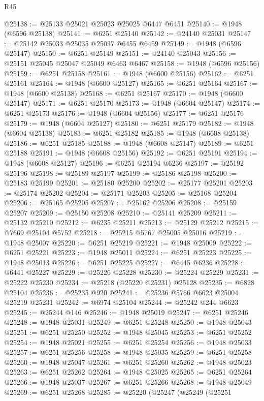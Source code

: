 \begin{lexlean}{R45}
\begin{coremodule}
{@25138 := @25133 @25021 @25023 @25025 @6447 @6451
@25140 := @1948 (@6596 @25138)
@25141 := @6251 @25140
@25142 := @24140 @25031
@25147 := @25142 @25033 @25035 @25037 @6455 @6459
@25149 := @1948 (@6596 @25147)
@25150 := @6251 @25149
@25151 := @24140 @25043
@25156 := @25151 @25045 @25047 @25049 @6463 @6467
@25158 := @1948 (@6596 @25156)
@25159 := @6251 @25158
@25161 := @1948 (@6600 @25156)
@25162 := @6251 @25161
@25164 := @1948 (@6600 @25127)
@25165 := @6251 @25164
@25167 := @1948 (@6600 @25138)
@25168 := @6251 @25167
@25170 := @1948 (@6600 @25147)
@25171 := @6251 @25170
@25173 := @1948 (@6604 @25147)
@25174 := @6251 @25173
@25176 := @1948 (@6604 @25156)
@25177 := @6251 @25176
@25179 := @1948 (@6604 @25127)
@25180 := @6251 @25179
@25182 := @1948 (@6604 @25138)
@25183 := @6251 @25182
@25185 := @1948 (@6608 @25138)
@25186 := @6251 @25185
@25188 := @1948 (@6608 @25147)
@25189 := @6251 @25188
@25191 := @1948 (@6608 @25156)
@25192 := @6251 @25191
@25194 := @1948 (@6608 @25127)
@25196 := @6251 @25194 @6236
@25197 := @25192 @25196
@25198 := @25189 @25197
@25199 := @25186 @25198
@25200 := @25183 @25199
@25201 := @25180 @25200
@25202 := @25177 @25201
@25203 := @25174 @25202
@25204 := @25171 @25203
@25205 := @25168 @25204
@25206 := @25165 @25205
@25207 := @25162 @25206
@25208 := @25159 @25207
@25209 := @25150 @25208
@25210 := @25141 @25209
@25211 := @25132 @25210
@25212 := @6235 @25211
@25213 := @25129 @25212
@25215 := @7669 @25104 @5752
@25218 := @25215 @5767 @25005 @25016
@25219 := @1948 @25007
@25220 := @6251 @25219
@25221 := @1948 @25009
@25222 := @6251 @25221
@25223 := @1948 @25011
@25224 := @6251 @25223
@25225 := @1948 @25013
@25226 := @6251 @25225
@25227 := @6445 @6236
@25228 := @6441 @25227
@25229 := @25226 @25228
@25230 := @25224 @25229
@25231 := @25222 @25230
@25234 := @25218 (@25220 @25231) @25128
@25235 := @6828 @25104
@25236 := @25235 @920
@25241 := @25236 @5766 @6623 @25004 @25219 @25231
@25242 := @6974 @25104
@25244 := @25242 @244 @6623
@25245 := @25244 @146
@25246 := @1948 @25019
@25247 := @6251 @25246
@25248 := @1948 @25031
@25249 := @6251 @25248
@25250 := @1948 @25043
@25251 := @6251 @25250
@25252 := @1948 @25045
@25253 := @6251 @25252
@25254 := @1948 @25021
@25255 := @6251 @25254
@25256 := @1948 @25033
@25257 := @6251 @25256
@25258 := @1948 @25035
@25259 := @6251 @25258
@25260 := @1948 @25047
@25261 := @6251 @25260
@25262 := @1948 @25023
@25263 := @6251 @25262
@25264 := @1948 @25025
@25265 := @6251 @25264
@25266 := @1948 @25037
@25267 := @6251 @25266
@25268 := @1948 @25049
@25269 := @6251 @25268
@25285 := @25220
    (@25247
      (@25249
        (@25251
}
\end{coremodule}
\end{lexlean}
